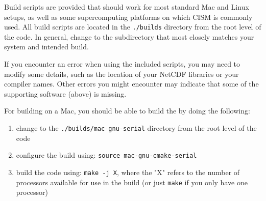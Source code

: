 Build scripts are provided that should work for most standard Mac and Linux setups, 
as well as some supercomputing platforms on which CISM is commonly used.
All build scripts are located in the \texttt{./builds} directory from the root level of the code.
In general, change to the subdirectory that most closely matches your system and intended
build.

If you encounter an error when using the included scripts, you may need to modify some details, 
such as the location of your NetCDF libraries or your compiler names.  Other errors you might 
encounter may indicate that some of the supporting software (above) is missing.


\begin{mdframed}[style=mac] %
For building on a Mac, you should be able to build the by doing the following:

\begin{enumerate}
\item{change to the \texttt{./builds/mac-gnu-serial} directory from the root level of the code}
\item{configure the build using: \texttt{source mac-gnu-cmake-serial}}
\item{build the code using: \texttt{make -j X}, where the "X" refers to the number of processors available for use in the build (or just \texttt{make} if you only have one processor)}
\end{enumerate}
\end{mdframed}              %


